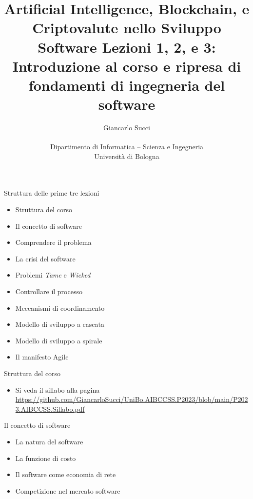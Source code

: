 \documentclass{beamer}
\title[L01]{Artificial Intelligence, Blockchain, e Criptovalute nello Sviluppo Software \newline\newline
Lezioni 1, 2, e 3: Introduzione al corso e ripresa di fondamenti di ingegneria del software} %
\author[{\tiny Giancarlo Succi }]{Giancarlo Succi\\\\ Dipartimento di Informatica -- Scienza e Ingegneria\\Universit\`{a} di Bologna\\
\bftt{g.succi@unibo.it}
} %
\institute[unibo] %
\date{} %
\begin{document}
\begin{frame}
\titlepage %

\end{frame}




\begin{frame}
{\centerline{Struttura delle prime tre lezioni}}
\begin{itemize}
    \item Struttura del corso
    \item Il concetto di software
    \item Comprendere il problema
    \item La crisi del software
    \item Problemi \textit{Tame} e \textit{Wicked}
    \item Controllare il processo
    \item Meccanismi di coordinamento
    \item Modello di sviluppo a cascata
    \item Modello di sviluppo a spirale
    \item Il manifesto Agile
\end{itemize} 
\end{frame}

\begin{frame}
{\centerline{Struttura del corso}}
\begin{itemize}
    \item Si veda il sillabo alla pagina \url{https://github.com/GiancarloSucci/UniBo.AIBCCSS.P2023/blob/main/P2023.AIBCCSS.Sillabo.pdf}
\end{itemize} 
\end{frame}


\begin{frame}
{\centerline{Il concetto di software}}
\begin{itemize}
    \item La natura del software
    \item La funzione di costo
    \item Il software come economia di rete 
    \item Competizione nel mercato software
\end{itemize} 
\end{frame}
\end{document}
